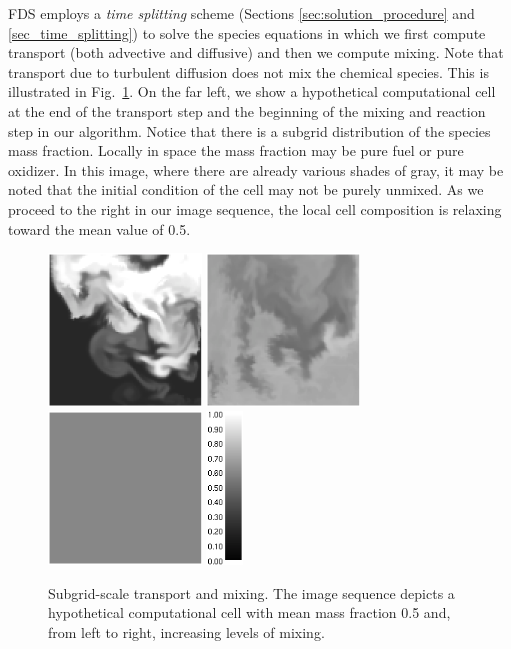 FDS employs a \emph{time splitting} scheme (Sections \ref{sec:solution_procedure} and \ref{sec_time_splitting}) to solve the species equations in which we first compute transport (both advective and diffusive) and then we compute mixing.  Note that transport due to turbulent diffusion does not mix the chemical species.  This is illustrated in Fig.~\ref{fig_transport_vs_mixing}.  On the far left, we show a hypothetical computational cell at the end of the transport step and the beginning of the mixing and reaction step in our algorithm.  Notice that there is a subgrid distribution of the species mass fraction.  Locally in space the mass fraction may be pure fuel or pure oxidizer.  In this image, where there are already various shades of gray, it may be noted that  the initial condition of the cell may not be purely unmixed.  As we proceed to the right in our image sequence, the local cell composition is relaxing toward the mean value of 0.5. 

\begin{figure}[h]
\centering
\includegraphics[width=1.6in]{FIGURES/transport_vs_mixing_1} \quad 
\includegraphics[width=1.6in]{FIGURES/transport_vs_mixing_2} \quad
\includegraphics[width=1.6in]{FIGURES/transport_vs_mixing_3} \quad
\includegraphics[height=1.6in]{FIGURES/transport_vs_mixing_colorbar}
\caption{Subgrid-scale transport and mixing. The image sequence depicts a hypothetical computational cell with mean mass fraction 0.5 and, from left to right, increasing levels of mixing.}
\label{fig_transport_vs_mixing}
\end{figure}

